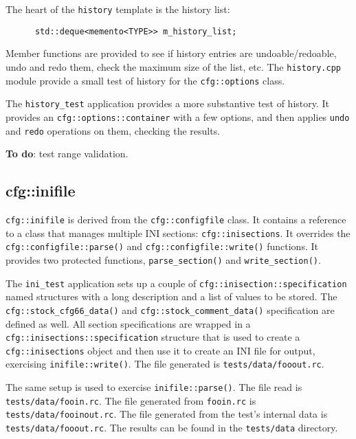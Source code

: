   The heart of the \texttt{history} template is the history list:

   \begin{verbatim}
      std::deque<memento<TYPE>> m_history_list;
   \end{verbatim}

   Member functions are provided to see if history entries are
   undoable/redoable, undo and redo them, check the maximum size of the list,
   etc.
   The \texttt{history.cpp} module provide a small test of history for
   the \texttt{cfg::options} class.

   The \texttt{history\_test} application provides a more substantive
   test of history.
   It provides an \texttt{cfg::options::container} with a few options, and
   then applies \texttt{undo} and
   \texttt{redo} operations on them, checking the results.

   \textbf{To do}: test range validation.

\subsection{cfg::inifile}
\label{subsec:cfg_namespace_inifile}

   \texttt{cfg::inifile} is derived from the \texttt{cfg::configfile} class.
   It contains a reference to a class that manages multiple
   INI sections: \texttt{cfg::inisections}.
   It overrides the
   \texttt{cfg::configfile::parse()} and
   \texttt{cfg::configfile::write()} functions.
   It provides two protected functions,
   \texttt{parse\_section()} and
   \texttt{write\_section()}.

   The \texttt{ini\_test} application sets up a couple of
   \texttt{cfg::inisection::specification} named structures 
   with a long description and a list of values to be stored.
   The \texttt{cfg::stock\_cfg66\_data()} and
   \texttt{cfg::stock\_comment\_data()} specification are defined as well.
   All section specifications are wrapped in a
   \texttt{cfg::inisections::specification} structure
   that is used to create a
   \texttt{cfg::inisections} object and then use it to
   create an INI file for output, exercising \texttt{inifile::write()}.
   The file generated is \texttt{tests/data/fooout.rc}.

   The same setup is used to exercise \texttt{inifile::parse()}.
   The file read is \texttt{tests/data/fooin.rc}.
   The file generated from \texttt{fooin.rc} is
   \texttt{tests/data/fooinout.rc}.
   The file generated from the test's internal data is
   \texttt{tests/data/fooout.rc}.
   The results can be found in the \texttt{tests/data} directory.


